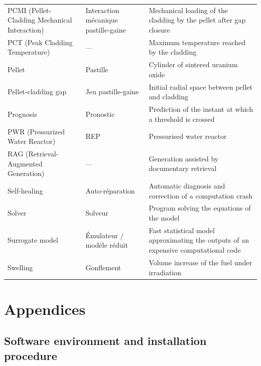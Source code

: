 \documentclass[12pt,a4paper]{report}
\makeatletter
\newcommand{\tocAppendixWidth}{%
  \renewcommand*\l@section{\@dottedtocline{1}{1.5em}{5.8em}}}
\makeatother
\begin{document}
\begin{xltabular}{\textwidth}{@{}>{\raggedright\arraybackslash}p{4.2cm}
                     >{\raggedright\arraybackslash}p{3.1cm}
                     >{\raggedright\arraybackslash}X@{}}
PCMI (Pellet-Cladding Mechanical Interaction) & Interaction mécanique
  pastille-gaine & Mechanical loading of the cladding by the pellet after gap
  closure\\
PCT (Peak Cladding Temperature) & --- & Maximum temperature reached by the
  cladding\\
Pellet & Pastille & Cylinder of sintered uranium oxide\\
Pellet-cladding gap & Jeu pastille-gaine & Initial radial space between pellet
  and cladding\\
Prognosis & Pronostic & Prediction of the instant at which a threshold is
  crossed\\
PWR (Pressurized Water Reactor) & REP & Pressurised water reactor\\
RAG (Retrieval-Augmented Generation) & --- & Generation assisted by documentary
  retrieval\\
Self-healing & Auto-réparation & Automatic diagnosis and correction of a
  computation crash\\
Solver & Solveur & Program solving the equations of the model\\
Surrogate model & Émulateur / modèle réduit & Fast statistical model
  approximating the outputs of an expensive computational code\\
Swelling & Gonflement & Volume increase of the fuel under irradiation\\
\bottomrule
\end{xltabular}

\clearpage
\appendix
\chapter*{Appendices}

\renewcommand{\thesection}{Appendix \Alph{section}}
\setcounter{section}{0}
\addtocontents{toc}{\protect\tocAppendixWidth}

\section{Software environment and installation procedure}
\label{ann:install}
\end{document}
